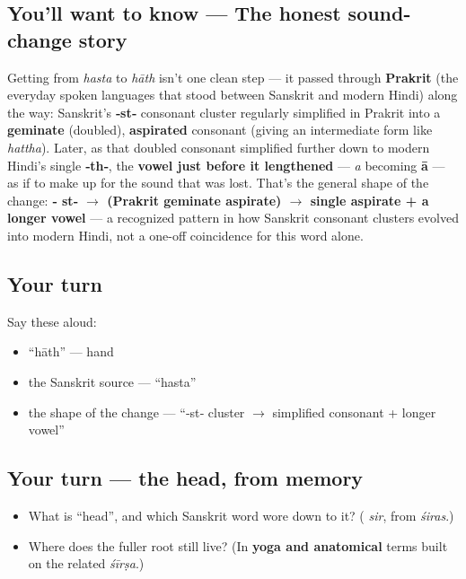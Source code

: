 \subsection*{You'll want to know — The honest sound-change story}
Getting from \emph{hasta} to \emph{hāth} isn't one clean step — it passed through \textbf{Prakrit} (the everyday spoken languages that stood between Sanskrit and modern Hindi) along the way: Sanskrit's \textbf{‑st‑} consonant cluster regularly simplified in Prakrit into a \textbf{geminate} (doubled), \textbf{aspirated} consonant (giving an intermediate form like \emph{hattha}). Later, as that doubled consonant simplified further down to modern Hindi's single \textbf{‑th‑}, the \textbf{vowel just before it lengthened} — \emph{a} becoming \textbf{ā} — as if to make up for the sound that was lost. That's the general shape of the change: \textbf{‑ st‑ $\to$ (Prakrit geminate aspirate) $\to$ single aspirate + a longer vowel} — a recognized pattern in how Sanskrit consonant clusters evolved into modern Hindi, not a one-off coincidence for this word alone.

\subsection*{Your turn}
Say these aloud:

\begin{itemize}
\raggedright
  \item \textquotedblleft{}hāth\textquotedblright{} — hand
  \item the Sanskrit source — \textquotedblleft{}hasta\textquotedblright{}
  \item the shape of the change — \textquotedblleft{}‑st‑ cluster $\to$ simplified consonant + longer vowel\textquotedblright{}
\end{itemize}

\subsection*{Your turn — the head, from memory}
\begin{itemize}
\raggedright
  \item What is \textquotedblleft{}head\textquotedblright{}, and which Sanskrit word wore down to it? (\textbf{} \emph{sir}, from \textbf{} \emph{śiras}.)
  \item Where does the fuller root still live? (In \textbf{yoga and anatomical} terms built on the related \emph{śīrṣa}.)
\end{itemize}

